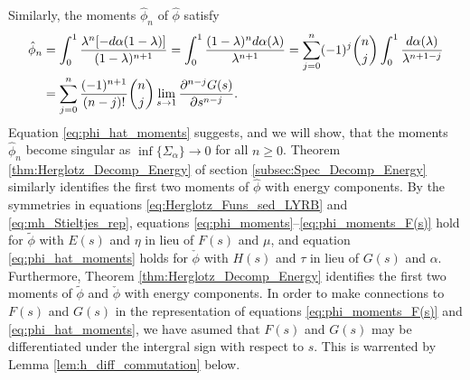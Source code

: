 \documentclass[english,12pt]{ttuthes}
\newcommand{\ph}{\hat{\phi}}
\begin{document}
Similarly, the moments $\ph_n$ of $\ph$ satisfy
%
\begin{align}\label{eq:phi_hat_moments}
  \ph_n%
      &=\int_0^1\frac{\lambda^n[-d\alpha(1-\lambda)]}{(1-\lambda)^{n+1}}
      =\int_0^1\frac{(1-\lambda)^nd\alpha(\lambda)}{\lambda^{n+1}}
      =\sum_{j=0}^n(-1)^j {n \choose j} \int_0^1\frac{d\alpha(\lambda)}{\lambda^{n+1-j}}\notag\\
      &=\sum_{j=0}^n\frac{(-1)^{n+1}}{(n-j)!}{n \choose j}
             \lim_{s\to1}\frac{\partial^{n-j}G(s)}{\partial s^{n-j}}.
\end{align}
%
Equation \eqref{eq:phi_hat_moments} suggests, and we will show, that
the moments $\ph_n$ become singular as $\inf\{\Sigma_\alpha\}\to0$ for all
$n\geq0$. Theorem \ref{thm:Herglotz_Decomp_Energy} of section
\ref{subsec:Spec_Decomp_Energy} similarly identifies the first two
moments of $\ph$ with energy components. By the symmetries in
equations \eqref{eq:Herglotz_Funs_sed_LYRB} and
\eqref{eq:mh_Stieltjes_rep}, equations 
\eqref{eq:phi_moments}--\eqref{eq:phi_moments_F(s)} hold for
$\tilde{\phi}$ with $E(s)$ and $\eta$ in lieu of $F(s)$ and $\mu$, and equation
\eqref{eq:phi_hat_moments} holds for $\check{\phi}$ with $H(s)$ and $\tau$ in lieu
of $G(s)$ and $\alpha$. Furthermore, Theorem \ref{thm:Herglotz_Decomp_Energy}
identifies the first two moments of $\tilde{\phi}$ and $\check{\phi}$ with
energy components. In order to make connections to $F(s)$ and $G(s)$ in the
representation of equations \eqref{eq:phi_moments_F(s)} and
\eqref{eq:phi_hat_moments}, we have asumed that $F(s)$ and $G(s)$ may
be differentiated under the intergral sign with respect to $s$. This
is warrented by Lemma \ref{lem:h_diff_commutation} below. 
\end{document}

